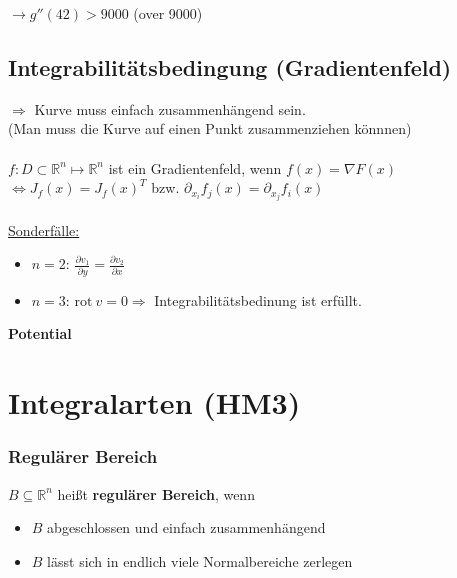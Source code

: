 \documentclass[6pt,a4paper]{scrartcl}
\renewcommand{\emph}[1]{\textbf{#1}}															%
\newcommand{\Ra}[0]{\ensuremath{\Rightarrow}}									%
\newcommand{\ra}[0]{\ensuremath{\rightarrow}} 									%
\newcommand{\diff}{\ensuremath{\;\mathrm d}}									%
\newcommand{\rot}{\ensuremath{\mathrm{rot}\ }}									%
\newcommand{\R}{\ensuremath{\mathbb R}}
\begin{document}
\begin{multicols*}{4}
$\ra g''(42) > 9000$ (over 9000)

\subsection{Integrabilitätsbedingung (Gradientenfeld)} %
$\Ra$ Kurve muss einfach zusammenhängend sein. \\
(Man muss die Kurve auf einen Punkt zusammenziehen könnnen) \\ \\
$f:D \subset \R^n \mapsto \R^n$ ist ein Gradientenfeld, wenn $f(x) = \nabla{F(x)}$ \\
$\Leftrightarrow \boxed{J_f(x) = J_f(x)^T}$ bzw. $\partial_{x_i}f_j(x) = \partial_{x_j}f_i(x)$ \\ \\
\underline{Sonderfälle:}
\begin{itemize} \itemsep0pt
	\item $n = 2$: $\frac{\partial v_1}{\partial y} = \frac{\partial v_2}{\partial x}$
	\item $n = 3$: $\rot v = 0 \Ra $ Integrabilitätsbedinung ist erfüllt.
\end{itemize}

\textbf{Potential}






\section{Integralarten (HM3)}

\subsubsection{Regulärer Bereich}
$B \subseteq \R^n$ heißt \emph{regulärer Bereich}, wenn
\begin{itemize}
	\item $B$ abgeschlossen und einfach zusammenhängend
	\item $B$ lässt sich in endlich viele Normalbereiche zerlegen\\
\end{itemize}				


\end{multicols*}
\end{document}
